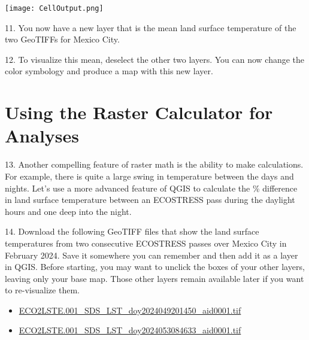 \documentclass[oneside,a4paper,11pt,explicit]{book}
\begin{document}
\centerline{\texttt{[image: CellOutput.png]}}

\vspace{.5em}

11. You now have a new layer that is the mean land surface temperature of the two GeoTIFFs for Mexico City.

12. To visualize this mean, deselect the other two layers. You can now change the color symbology and produce a map with this new layer. 


\section{Using the Raster Calculator for Analyses}

13. Another compelling feature of raster math is the ability to make calculations. For example, there is quite a large swing in temperature between the days and nights. Let's use a more advanced feature of QGIS to calculate the \% difference in land surface temperature between an ECOSTRESS pass during the daylight hours and one deep into the night.

14. Download the following GeoTIFF files that show the land surface temperatures from two consecutive ECOSTRESS passes over Mexico City in February 2024. Save it somewhere you can remember and then add it as a layer in QGIS. Before starting, you may want to unclick the boxes of your other layers, leaving only your base map. Those other layers remain available later if you want to re-visualize them. 

\begin{itemize}
    \item \href{https://jeremydforsythe.github.io/icecream-tutorials/Tutorial11_RasterCalculator/ECO2LSTE.001_SDS_LST_doy2024049201450_aid0001.tif}{\small ECO2LSTE.001\_SDS\_LST\_doy2024049201450\_aid0001.tif}
    \item \href{https://jeremydforsythe.github.io/icecream-tutorials/Tutorial11_RasterCalculator/ECO2LSTE.001_SDS_LST_doy2024053084633_aid0001.tif}{\small ECO2LSTE.001\_SDS\_LST\_doy2024053084633\_aid0001.tif}
\end{itemize}
\end{document}
